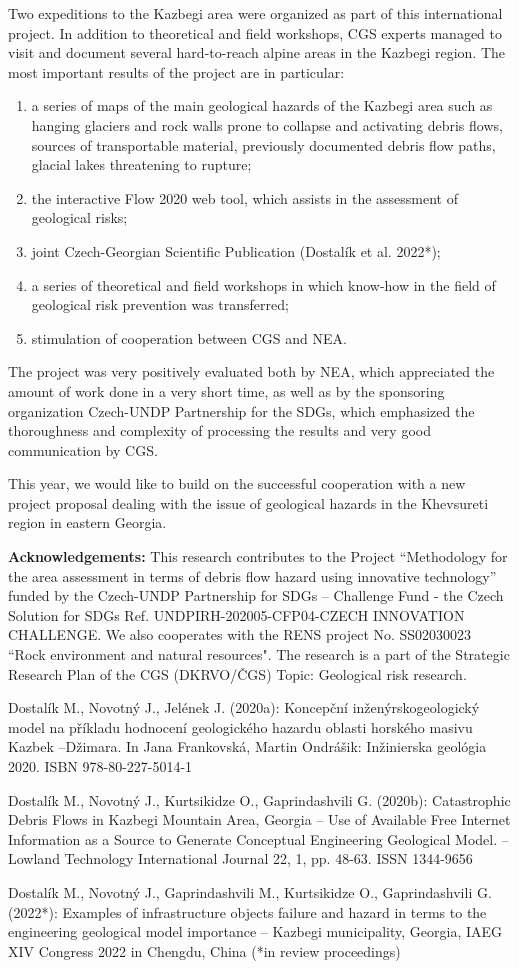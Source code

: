 {Two expeditions to the Kazbegi area were organized as part of this international project. In addition to theoretical and field workshops, CGS experts managed to visit and document several hard-to-reach alpine areas in the Kazbegi region. The most important results of the project are in particular:
\begin{enumerate}
\item  a series of maps of the main geological hazards of the Kazbegi area such as hanging glaciers and rock walls prone to collapse and activating debris flows, sources of transportable material, previously documented debris flow paths, glacial lakes threatening to rupture;
\item the interactive Flow 2020 web tool, which assists in the assessment of geological risks;
\item joint Czech-Georgian Scientific Publication (Dostalík et al. 2022*);
\item a series of theoretical and field workshops in which know-how in the field of geological risk prevention was transferred;
\item stimulation of cooperation between CGS and NEA.
\end{enumerate}	

The project was very positively evaluated both by NEA, which appreciated the amount of work done in a very short time, as well as by the sponsoring organization Czech-UNDP Partnership for the SDGs, which emphasized the thoroughness and complexity of processing the results and very good communication by CGS. 

This year, we would like to build on the successful cooperation with a new project proposal dealing with the issue of geological hazards in the Khevsureti region in eastern Georgia.

\noindent
\textbf{Acknowledgements:}
This research contributes to the Project “Methodology for the area assessment in terms of debris flow hazard using innovative technology” funded by the Czech-UNDP Partnership for SDGs – Challenge Fund - the Czech Solution for SDGs Ref. UNDPIRH-202005-CFP04-CZECH INNOVATION CHALLENGE. 
We also cooperates with the RENS project No. SS02030023 “Rock environment and natural resources".
The research is a part of the Strategic Research Plan of the CGS (DKRVO/ČGS) Topic: Geological risk research.
}
{Dostalík M., Novotný J., Jelének J. (2020a): Koncepční inženýrskogeologický model na příkladu hodnocení geologického hazardu oblasti horského masivu Kazbek –Džimara. In Jana Frankovská, Martin Ondrášik: Inžinierska geológia 2020. ISBN 978-80-227-5014-1

Dostalík M., Novotný J., Kurtsikidze O., Gaprindashvili G. (2020b): Catastrophic Debris Flows in Kazbegi Mountain Area, Georgia – Use of Available Free Internet Information as a Source to Generate Conceptual Engineering Geological Model. – Lowland Technology International Journal 22, 1, pp. 48-63. ISSN 1344-9656
	
Dostalík M., Novotný J., Gaprindashvili M., Kurtsikidze O., Gaprindashvili G. (2022*): Examples of infrastructure objects failure and hazard in terms to the engineering geological model importance – Kazbegi municipality, Georgia, IAEG XIV Congress 2022 in Chengdu, China (*in review proceedings)
}



